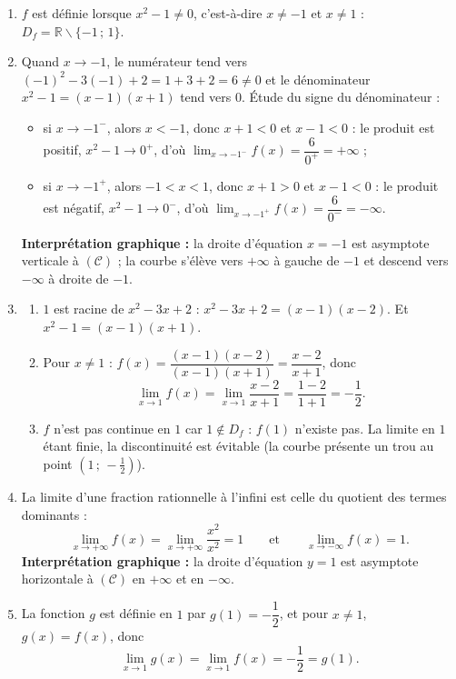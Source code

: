 \documentclass[11pt]{article}
\def\setminus{\mathbin{\backslash}}\let\smallsetminus\setminus
\begin{document}
\begin{corrige}
\begin{enumerate}
\item $f$ est définie lorsque $x^2-1\neq 0$, c'est-à-dire $x\neq -1$ et $x\neq 1$ : $D_f=\mathbb{R}\setminus\{-1\,;\,1\}$.
\item Quand $x\to -1$, le numérateur tend vers $(-1)^2-3(-1)+2=1+3+2=6\neq 0$ et le dénominateur $x^2-1=(x-1)(x+1)$ tend vers $0$. Étude du signe du dénominateur :
\begin{itemize}
\item si $x\to -1^-$, alors $x<-1$, donc $x+1<0$ et $x-1<0$ : le produit est positif, $x^2-1\to 0^+$, d'où $\displaystyle\lim_{x\to -1^-}f(x)=\dfrac{6}{0^+}=+\infty$ ;
\item si $x\to -1^+$, alors $-1<x<1$, donc $x+1>0$ et $x-1<0$ : le produit est négatif, $x^2-1\to 0^-$, d'où $\displaystyle\lim_{x\to -1^+}f(x)=\dfrac{6}{0^-}=-\infty$.
\end{itemize}
\textbf{Interprétation graphique :} la droite d'équation $x=-1$ est asymptote verticale à $(\mathcal{C})$ ; la courbe s'élève vers $+\infty$ à gauche de $-1$ et descend vers $-\infty$ à droite de $-1$.
\item \begin{enumerate}
\item $1$ est racine de $x^2-3x+2$ : $x^2-3x+2=(x-1)(x-2)$. Et $x^2-1=(x-1)(x+1)$.
\item Pour $x\neq 1$ : $f(x)=\dfrac{(x-1)(x-2)}{(x-1)(x+1)}=\dfrac{x-2}{x+1}$, donc
\[ \lim_{x\to 1}f(x)=\lim_{x\to 1}\dfrac{x-2}{x+1}=\dfrac{1-2}{1+1}=-\dfrac{1}{2}. \]
\item $f$ n'est pas continue en $1$ car $1\notin D_f$ : $f(1)$ n'existe pas. La limite en $1$ étant finie, la discontinuité est évitable (la courbe présente un \og trou \fg{} au point $\left(1\,;\,-\frac{1}{2}\right)$).
\end{enumerate}
\item La limite d'une fraction rationnelle à l'infini est celle du quotient des termes dominants :
\[ \lim_{x\to+\infty}f(x)=\lim_{x\to+\infty}\dfrac{x^2}{x^2}=1 \qquad\text{et}\qquad \lim_{x\to-\infty}f(x)=1. \]
\textbf{Interprétation graphique :} la droite d'équation $y=1$ est asymptote horizontale à $(\mathcal{C})$ en $+\infty$ et en $-\infty$.
\item La fonction $g$ est définie en $1$ par $g(1)=-\dfrac{1}{2}$, et pour $x\neq 1$, $g(x)=f(x)$, donc
\[ \lim_{x\to 1}g(x)=\lim_{x\to 1}f(x)=-\dfrac{1}{2}=g(1). \]

\end{enumerate}
\end{corrige}
\end{document}
